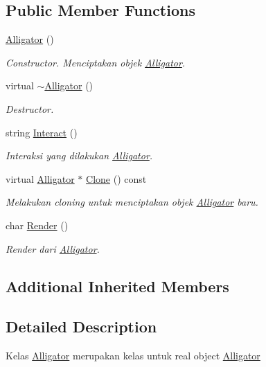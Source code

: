 \subsection*{Public Member Functions}
\begin{DoxyCompactItemize}
\item 
\hyperlink{classAlligator_af1f21eea8d991b0ceb892448f456e587}{Alligator} ()
\begin{DoxyCompactList}\small\item\em Constructor. Menciptakan objek \hyperlink{classAlligator}{Alligator}. \end{DoxyCompactList}\item 
virtual \hyperlink{classAlligator_a9504f449fe1f01c94c0052f994340b14}{$\sim$\+Alligator} ()
\begin{DoxyCompactList}\small\item\em Destructor. \end{DoxyCompactList}\item 
string \hyperlink{classAlligator_a8f6141caa973d33f2066c3561cd817b3}{Interact} ()
\begin{DoxyCompactList}\small\item\em Interaksi yang dilakukan \hyperlink{classAlligator}{Alligator}. \end{DoxyCompactList}\item 
virtual \hyperlink{classAlligator}{Alligator} $\ast$ \hyperlink{classAlligator_aa317f0d37332919f638128c41cd7b53f}{Clone} () const 
\begin{DoxyCompactList}\small\item\em Melakukan cloning untuk menciptakan objek \hyperlink{classAlligator}{Alligator} baru. \end{DoxyCompactList}\item 
char \hyperlink{classAlligator_aa8f0a207888bf7f682ebc6b57270dd33}{Render} ()
\begin{DoxyCompactList}\small\item\em Render dari \hyperlink{classAlligator}{Alligator}. \end{DoxyCompactList}\end{DoxyCompactItemize}
\subsection*{Additional Inherited Members}


\subsection{Detailed Description}
Kelas \hyperlink{classAlligator}{Alligator} merupakan kelas untuk real object \hyperlink{classAlligator}{Alligator} 

